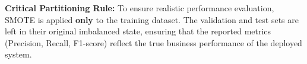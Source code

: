 \textbf{Critical Partitioning Rule:} To ensure realistic performance evaluation, SMOTE is applied \textbf{only} to the training dataset. The validation and test sets are left in their original imbalanced state, ensuring that the reported metrics (Precision, Recall, F1-score) reflect the true business performance of the deployed system.